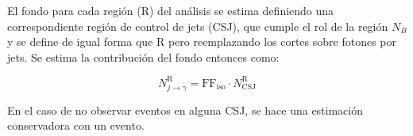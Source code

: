 El fondo para cada región (R) del análisis se estima definiendo una correspondiente región de control de jets (CSJ), que cumple el rol de la región $N_B$ y se define de igual forma que R pero reemplazando los cortes sobre fotones por jets. Se estima la contribución del fondo entonces como:

\begin{equation}
  N^{\text{R}}_{j\rightarrow\gamma} = \text{FF}_{\text{iso}} \cdot N^{\text{R}}_{\mathrm{CSJ}} 
  \label{eq:jfake_cs}
\end{equation}

En el caso de no observar eventos en alguna CSJ, se hace una estimación conservadora con un evento.


\begin{table}[!ht]
  \centering
  \caption{Valores obtenidos para los factores de reconstrucción errónea de jets en fotones en función del \pt y $|\eta|$ del fotón, y la \met del evento. Las incertidumbres son tanto estadísticas como sistemáticas.}
\end{table}
